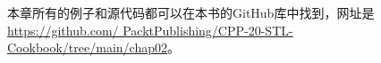 


本章所有的例子和源代码都可以在本书的GitHub库中找到，网址是\url{https://github.com/	PacktPublishing/CPP-20-STL-Cookbook/tree/main/chap02}。


